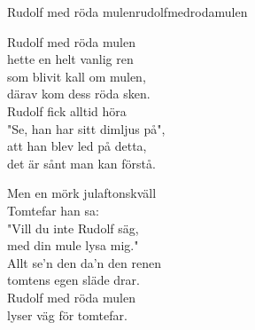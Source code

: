 \begin{song}{Rudolf med röda mulen}{rudolfmedrodamulen}
\begin{vers}
Rudolf med röda mulen\\
hette en helt vanlig ren\\
som blivit kall om mulen,\\
därav kom dess röda sken.\\
Rudolf fick alltid höra\\
"Se, han har sitt dimljus på",\\
att han blev led på detta,\\
det är sånt man kan förstå.\\
\end{vers}
\begin{vers}
Men en mörk julaftonskväll\\
Tomtefar han sa:\\
"Vill du inte Rudolf säg,\\
med din mule lysa mig."\\
Allt se'n den da'n den renen\\
tomtens egen släde drar.\\
Rudolf med röda mulen\\
lyser väg för tomtefar.\\
\end{vers}
\end{song}
